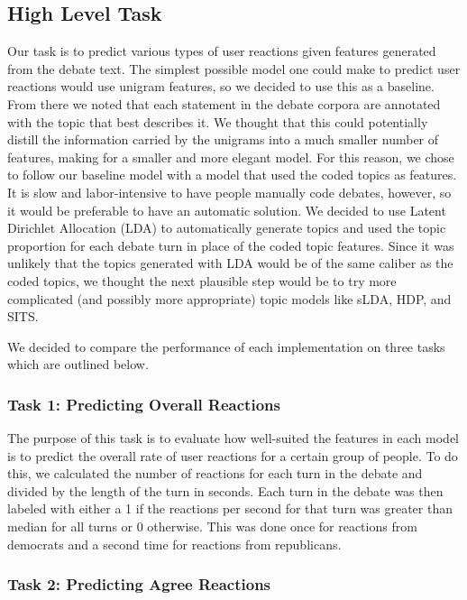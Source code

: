 
\subsection{High Level Task}

Our task is to predict various types of user reactions given features generated from the debate text.
The simplest possible model one could make to predict user reactions would use unigram features, so we decided to use this as a baseline.
From there we noted that each statement in the debate corpora are annotated with the topic that best describes it.
We thought that this could potentially distill the information carried by the unigrams into a much smaller number of features, making for a smaller and more elegant model.
For this reason, we chose to follow our baseline model with a model that used the coded topics as features.
It is slow and labor-intensive to have people manually code debates, however, so it would be preferable to have an automatic solution.
We decided to use Latent Dirichlet Allocation (LDA) to automatically generate topics and used the topic proportion for each debate turn in place of the  coded topic features.
Since it was unlikely that the topics generated with LDA would be of the same caliber as the coded topics, we thought the next plausible step would be to try more complicated (and possibly more appropriate) topic models like sLDA, HDP, and SITS.

We decided to compare the performance of each implementation on three tasks which are outlined below.

\subsubsection{Task 1: Predicting Overall Reactions}

The purpose of this task is to evaluate how well-suited the features in each model is to predict the overall rate of user reactions for a certain group of people.
To do this, we calculated the number of reactions for each turn in the debate and divided by the length of the turn in seconds.
Each turn in the debate was then labeled with either a 1 if the reactions per second for that turn was greater than median for all turns or 0 otherwise.
This was done once for reactions from democrats and a second time for reactions from republicans.

\subsubsection{Task 2: Predicting Agree Reactions}

